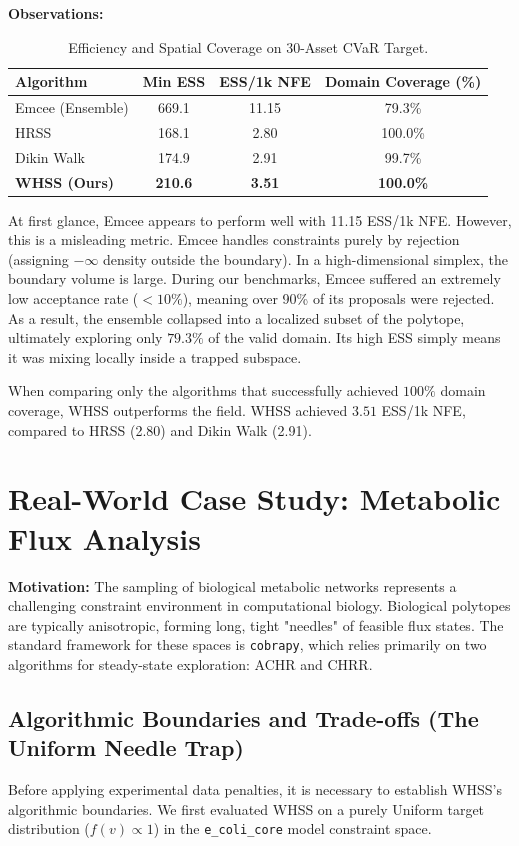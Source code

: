 \documentclass[12pt]{article}
\begin{document}
\textbf{Observations:}
\begin{table}[H]
\centering
\begin{tabular}{l|cc|c}
\toprule
\textbf{Algorithm} & \textbf{Min ESS} & \textbf{ESS/1k NFE} & \textbf{Domain Coverage (\%)} \\
\midrule
Emcee (Ensemble) & 669.1 & 11.15 & 79.3\% \\
HRSS & 168.1 & 2.80 & 100.0\% \\
Dikin Walk & 174.9 & 2.91 & 99.7\% \\
\textbf{WHSS (Ours)} & \textbf{210.6} & \textbf{3.51} & \textbf{100.0\%} \\
\bottomrule
\end{tabular}
\caption{Efficiency and Spatial Coverage on 30-Asset CVaR Target.}
\end{table}

At first glance, Emcee appears to perform well with 11.15 ESS/1k NFE. However, this is a misleading metric. Emcee handles constraints purely by rejection (assigning $-\infty$ density outside the boundary). In a high-dimensional simplex, the boundary volume is large. During our benchmarks, Emcee suffered an extremely low acceptance rate ($<10\%$), meaning over 90\% of its proposals were rejected. As a result, the ensemble collapsed into a localized subset of the polytope, ultimately exploring only $79.3\%$ of the valid domain. Its high ESS simply means it was mixing locally inside a trapped subspace. 

When comparing only the algorithms that successfully achieved $100\%$ domain coverage, WHSS outperforms the field. WHSS achieved $3.51$ ESS/1k NFE, compared to HRSS (2.80) and Dikin Walk (2.91).

\section{Real-World Case Study: Metabolic Flux Analysis}
\textbf{Motivation:} The sampling of biological metabolic networks represents a challenging constraint environment in computational biology. Biological polytopes are typically anisotropic, forming long, tight "needles" of feasible flux states. The standard framework for these spaces is \texttt{cobrapy}, which relies primarily on two algorithms for steady-state exploration: ACHR and CHRR. 

\subsection{Algorithmic Boundaries and Trade-offs (The Uniform Needle Trap)}
Before applying experimental data penalties, it is necessary to establish WHSS's algorithmic boundaries. We first evaluated WHSS on a purely Uniform target distribution ($f(v) \propto 1$) in the \texttt{e\_coli\_core} model constraint space.
\end{document}
